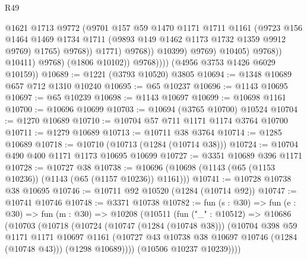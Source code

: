 \begin{lexlean}{R49}
\begin{coremodule}
                                      @1621
                                      @1713
                                      @9772
                                      (@9701
                                        @157
                                        @59
                                        @1470
                                        @1171
                                        @1711
                                        @1161
                                        (@9723
                                          @156
                                          @1464
                                          @1469
                                          @1734
                                          @1711
                                          (@9893 @149 @1462 @1173 @1732 @1359 @9912 @9769)
                                          @1765)
                                        @9768))
                                    @1771)
                                  @9768))
                              @10399)
                            @9769)
                          @10405)
                        @9768))
                    @10411)
                  @9768)
                (@1806 @10102))
              @9768))))
      (@4956 @3753 @1426 @6029 @10159))
@10689 := @1221 (@3793 @10520) @3805
@10694 := @1348 @10689 @657 @712 @1310 @10240
@10695 := @65 @10237
@10696 := @1143 @10695
@10697 := @65 @10239
@10698 := @1143 @10697
@10699 := @10698 @1161
@10700 := @10696 @10699
@10703 := @10694 (@3765 @10700) @10524
@10704 := @1270 @10689
@10710 := @10704 @57 @711 @1171 @1174 @3764 @10700
@10711 := @1279 @10689
@10713 := @10711 @38 @3764
@10714 := @1285 @10689
@10718 := @10710 (@10713 (@1284 (@10714 @38)))
@10724 := @10704 @490 @400 @1171 @1173 @10695 @10699
@10727 := @3351 @10689 @396 @1171
@10728 := @10727 @38
@10738 := @10696 (@10698 (@1143 (@65 (@1153 @10236)) (@1143 (@65 (@1157 @10236)) @1161)))
@10741 := @10728 @10738 @38 @10695
@10746 := @10711 @92 @10520 (@1284 (@10714 @92))
@10747 := @10741 @10746
@10748 := @3371 @10738
@10782 := fun (s : @30) =>
  fun (e : @30) =>
  fun (m : @30) =>
  @10208
    (@10511
      (fun ("_" : @10512) =>
      @10686
        (@10703
          (@10718
            (@10724
              (@10747 (@1284 (@10748 @38)))
              (@10704
                @398
                @59
                @1171
                @1171
                @10697
                @1161
                (@10727 @43 @10738 @38 @10697 @10746 (@1284 (@10748 @43)))
                (@1298 @10689))))
          (@10506 @10237 @10239))))

\end{coremodule}
\end{lexlean}
